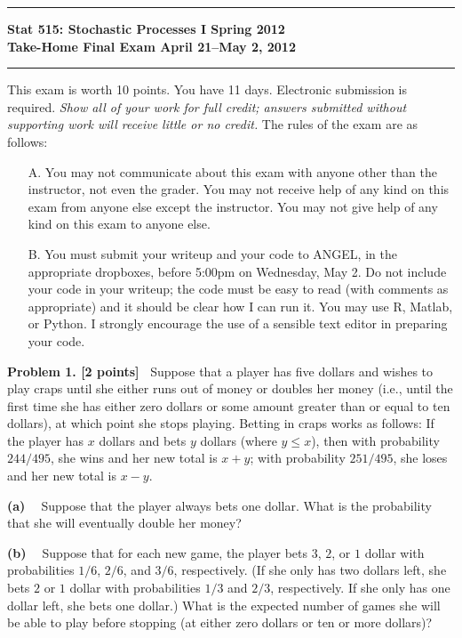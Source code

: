 \documentclass{article}
\newcommand{\svskip}{\vspace{.2in}}
\newcommand{\mvskip}{\vspace{.25in}}
\newcommand{\lvskip}{\vspace{.5in}}
\begin{document}
        \hrule
        \begin{center}
        \Large\bf Stat 515: Stochastic Processes I \hfill Spring 2012\\
        Take-Home Final Exam  \hfill April 21--May 2, 2012
        \end{center}
        \hrule


\mvskip 
This exam is worth 10 points.  You have 11 days.  Electronic submission
is required.  {\em Show all of your work for full credit; answers submitted without
supporting work will receive little or no credit.}  
The rules of the exam are as follows:

\begin{enumerate}
\item[A.]
You may not communicate about this exam with anyone other than the instructor, not even the grader. You may not receive help of any kind on this exam from anyone else except the instructor. You may not give help of any kind on this exam to anyone else.
\item [B.]
You must submit your writeup and your code to ANGEL, in the appropriate dropboxes, before 5:00pm on Wednesday, May 2.  Do not include your code in your writeup; the code must be easy to read (with comments as appropriate) and it should be clear how I can run it.  You may use R, Matlab, or Python.  I strongly encourage the use of a sensible text editor in preparing your code.
\end{enumerate}




\lvskip 
{\bf Problem 1. [2 points]\ } 
Suppose that a player has five dollars and wishes to play craps until she either runs out of money or 
doubles her money (i.e., until the first time she has either zero dollars or some amount greater than
or equal to ten dollars), at which point she stops playing.   
Betting in craps works as follows:  If the player has $x$ dollars and
bets $y$ dollars (where $y\le x$), then 
with probability $244/495$, she wins and her new total is $x+y$; with probability
$251/495$, she loses and her new total is $x-y$.

\svskip
{\bf(a) \ }
Suppose that the player always bets one dollar.  What is the probability that she will eventually
double her money?

\svskip
{\bf(b) \ }
Suppose that for each new game, the player bets $3$, $2$, or $1$ dollar with probabilities
$1/6$, $2/6$, and $3/6$, respectively.  (If she only has two dollars left, she bets $2$ or $1$ dollar
with probabilities $1/3$ and $2/3$, respectively.  If she only has one dollar left, she bets one 
dollar.)  
What is the expected number of games she will be able to play before stopping
(at either zero dollars or ten or more dollars)?
\end{document}
